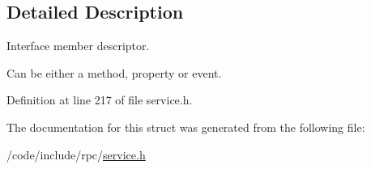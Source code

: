\subsection{Detailed Description}
Interface member descriptor.

Can be either a method, property or event. 

Definition at line 217 of file service.\+h.



The documentation for this struct was generated from the following file\+:\begin{DoxyCompactItemize}
\item 
/code/include/rpc/\hyperlink{service_8h}{service.\+h}\end{DoxyCompactItemize}
